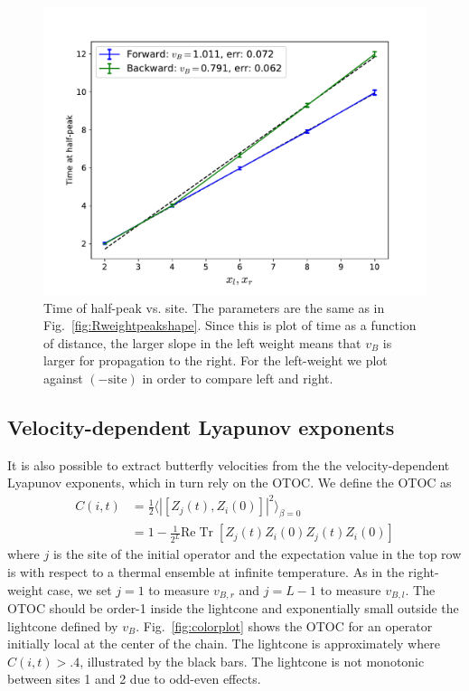 \documentclass[aps,prx,reprint,superscriptaddress, longbibliography]{revtex4-1}
\newcommand{\Tr}{ \mbox{Tr}}
\renewcommand{\Re}{ \mbox{Re}}
\newcommand{\half}{\frac{1}{2}}
\begin{document}
\begin{figure}
	\includegraphics[width=\columnwidth]{Rweighthalftimes}
	\caption{Time of half-peak vs. site. The parameters are the same as in Fig.~\ref{fig:Rweightpeakshape}. Since this is plot of time as a function of distance, the larger slope in the left weight means that $v_B$ is larger for propagation to the right. For the left-weight we plot against $(-\text{site})$ in order to compare left and right.}
	\label{fig:Rweightpeaktimes}
\end{figure}

\subsection{Velocity-dependent Lyapunov exponents}

It is also possible to extract butterfly velocities from the the velocity-dependent Lyapunov exponents, which in turn rely on the OTOC. We define the OTOC as 
\begin{align}
C(i,t) & = \half \langle|[Z_j(t),Z_i(0)]|^2\rangle_{\beta=0}\nonumber\\
&= 1 - \frac{1}{2^{L}}\Re\;\Tr\;[Z_j(t)Z_i(0)Z_j(t)Z_i(0)]
\end{align}
where $j$ is the site of the initial operator and the expectation value in the top row is with respect to a thermal ensemble at infinite temperature. As in the right-weight case, we set $j=1$ to measure $v_{B,r}$ and $j=L-1$ to measure $v_{B,l}$. The OTOC should be order-1 inside the lightcone and exponentially small outside the lightcone defined by $v_B$. Fig.~\ref{fig:colorplot} shows the OTOC for an operator initially local at the center of the chain. The lightcone is approximately where $C(i,t)>.4$, illustrated by the black bars. The lightcone is not monotonic between sites 1 and 2 due to odd-even effects.
\end{document}
